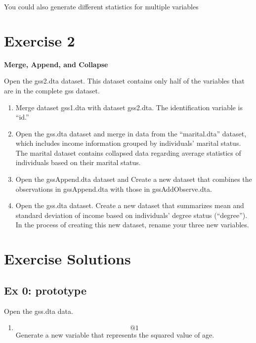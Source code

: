 \documentclass[]{book}
\providecommand{\tightlist}{%
  \setlength{\itemsep}{0pt}\setlength{\parskip}{0pt}}
\begin{document}
You could also generate different statistics for multiple variables

\section{Exercise 2}\label{exercise-2-4}

\textbf{Merge, Append, and Collapse}

Open the gss2.dta dataset. This dataset contains only half of the
variables that are in the complete gss dataset.

\begin{enumerate}
\def\labelenumi{\arabic{enumi}.}
\tightlist
\item
  Merge dataset gss1.dta with dataset gss2.dta. The identification
  variable is ``id.''
\item
  Open the gss.dta dataset and merge in data from the ``marital.dta''
  dataset, which includes income information grouped by individuals'
  marital status. The marital dataset contains collapsed data regarding
  average statistics of individuals based on their marital status.
\item
  Open the gssAppend.dta dataset and Create a new dataset that combines
  the observations in gssAppend.dta with those in gssAddObserve.dta.
\item
  Open the gss.dta dataset. Create a new dataset that summarizes mean
  and standard deviation of income based on individuals' degree status
  (``degree''). In the process of creating this new dataset, rename your
  three new variables.
\end{enumerate}

\section{Exercise Solutions}\label{exercise-solutions-5}

\subsection{Ex 0: prototype}\label{ex-0-prototype-5}

Open the gss.dta data.

\begin{enumerate}
\def\labelenumi{\arabic{enumi}.}
\tightlist
\item
  \[@1\] Generate a new variable that represents the squared value of
  age.
\end{enumerate}
\end{document}
